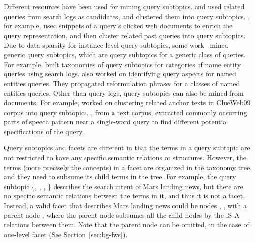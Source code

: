 Different resources have been used for mining query subtopics. \citet{wang2007learn} and \citet{hu2012mining} used related queries from search logs as candidates, and clustered them into query subtopics. \citet{wang2007learn}, for example, used snippets of a query's clicked web documents to enrich the query representation, and then cluster related past queries into query subtopics.
Due to data sparsity for instance-level query subtopics, some work~\cite{wang2009mining,xue2011topic,wu2011identifying,yin2010building} mined generic query subtopics, which are query subtopics for a generic class of queries. For example, \citet{yin2010building} built taxonomies of query subtopics for categories of name entity queries using search logs. \citet{wu2011identifying} also worked on identifying query aspects for named entities queries. They propagated reformulation phrases for a classes of named entities queries. Other than query logs, query subtopics can also be mined from documents. For example, \citet{dang2011inferring} worked on clustering related anchor texts in ClueWeb09 corpus into query subtopics. \citet{allan2002using}, from a text corpus, extracted commonly occurring parts of speech pattern near a single-word query to find different potential specifications of the query.

Query subtopics and facets are different in that the terms in a query subtopic are not restricted to have any specific semantic relations or structures. However, the terms (more precisely the concepts) in a facet are organized in the taxonomy tree, and they need to subsume its child terms in the tree. For example, the query subtopic \{, , , \} describes the search intent of Mars landing news, but there are no specific semantic relations between the terms in it, and thus it is not a facet. Instead, a valid facet that describes Mars landing news could be nodes , ,  with a parent node , where the parent node  subsumes all the child nodes by the IS-A relations between them. Note that the parent node can be omitted, in the case of one-level facet (See Section~\ref{sec:bg-fws}).

